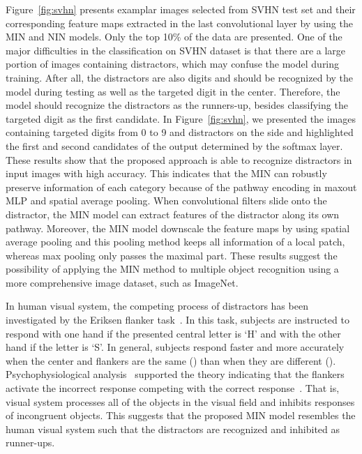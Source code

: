 \documentclass[10pt,twocolumn,letterpaper]{article}
\begin{document}
 Figure~\ref{fig:svhn} presents examplar images selected from SVHN test set and their corresponding feature maps extracted in the last convolutional layer by using the MIN and NIN models. Only the top 10\% of the data are presented. One of the major difficulties in the classification on SVHN dataset is that there are a large portion of images containing distractors, which may confuse the model during training. After all, the distractors are also digits and should  be recognized by the model during testing as well as the targeted digit in the center. Therefore, the model should recognize the distractors as the runners-up, besides classifying the targeted digit as the first candidate. In Figure~\ref{fig:svhn}, we presented the images containing targeted digits from 0 to 9 and distractors on the side and highlighted the first and second candidates of the output determined by the softmax layer. These results show that the proposed approach is able to recognize distractors in input images with high accuracy. 
 This indicates that the MIN can robustly preserve information of each category because of the pathway encoding in maxout MLP and spatial average pooling. When convolutional filters slide onto the distractor, the MIN model can extract features of the distractor along its own pathway. Moreover, the MIN model downscale the feature maps by using spatial average pooling and this pooling method keeps all information of a local patch, whereas max pooling only passes the maximal part. These results suggest the possibility of applying the MIN method to multiple object recognition using a more comprehensive image dataset, such as ImageNet.

In human visual system, the competing process of distractors has been investigated by the Eriksen flanker task~\cite{eriksen1974effects}. In this task, subjects are instructed to respond with one hand if the presented central letter is `H' and with the other hand if the letter is `S'. In general, subjects respond faster and more accurately when the center and flankers are the same () than when they are different ().
Psychophysiological analysis~\cite{gratton1988pre} supported the theory indicating that the flankers activate the incorrect response competing with the correct response~\cite{eriksen1979information}.
That is, visual system processes all of the objects in the visual field and inhibits responses of incongruent objects. 
This suggests that the proposed MIN model resembles the human visual system such that the distractors are recognized and inhibited as runner-ups.
\end{document}
